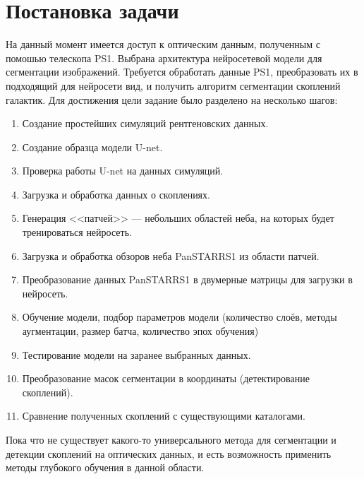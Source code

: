 \chapter{Постановка задачи}
\label{cha:ch_1}
На данный момент имеется доступ к оптическим данным, полученным с помошью телескопа PS1. Выбрана 
архитектура нейросетевой модели для сегментации изображений. Требуется обработать данные PS1, 
преобразовать их в подходящий для нейросети вид, и получить алгоритм сегментации скоплений галактик.
Для достижения цели задание было разделено на несколько шагов:

\begin{enumerate}
    \item Создание простейших симуляций рентгеновских данных.
    \item Создание образца модели U-net.
    \item Проверка работы U-net на данных симуляций.
    \item Загрузка и обработка данных о скоплениях.
    \item Генерация <<патчей>> --- небольших областей неба, на которых будет тренироваться нейросеть.
    \item Загрузка и обработка обзоров неба PanSTARRS1 из области патчей.
    \item Преобразование данных PanSTARRS1 в двумерные матрицы для загрузки в нейросеть.
    \item Обучение модели, подбор параметров модели (количество слоёв, методы аугментации, размер 
        батча, количество эпох обучения)
    \item Тестирование модели на заранее выбранных данных.
    \item Преобразование масок сегментации в координаты (детектирование скоплений).
    \item Сравнение полученных скоплений с существующими каталогами.
\end{enumerate}

Пока что не существует какого-то универсального метода для сегментации и детекции скоплений 
на оптических данных, и есть возможность применить методы глубокого обучения в данной области.\\
